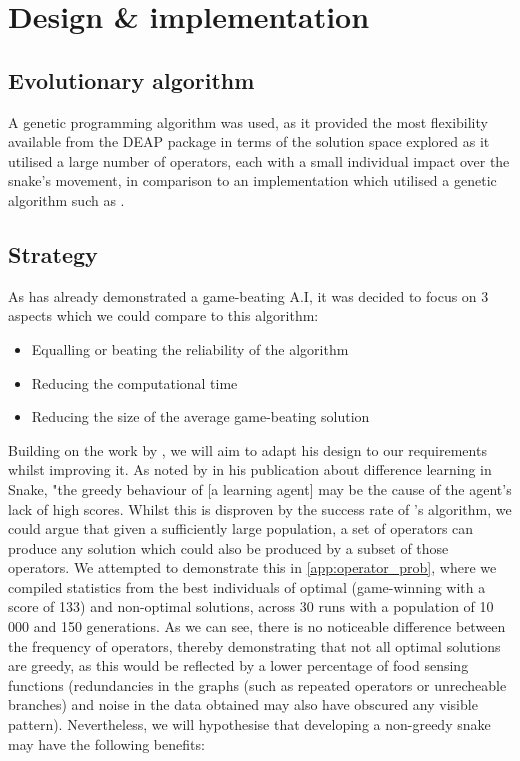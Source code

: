 \documentclass[british,10pt,a4paper]{article}
\begin{document}
\section{Design \& implementation}
\subsection{Evolutionary algorithm}
A genetic programming algorithm was used, as it provided the most flexibility available from the DEAP package in terms of the solution space explored as it utilised a large number of operators, each with a small individual impact over the snake's movement, in comparison to an implementation which utilised a genetic algorithm such as \citet{Yeh2016-ts}.

\subsection{Strategy}
As \citet{Ehlis2000-sz} has already demonstrated a game-beating A.I, it was decided to focus on 3 aspects which we could compare to this algorithm:
\begin{itemize}
	\item Equalling or beating the reliability of the algorithm
	\item Reducing the computational time
	\item Reducing the size of the average game-beating solution
\end{itemize}
Building on the work by \citeauthor{Ehlis2000-sz}, we will aim to adapt his design to our requirements whilst improving it. As noted by \citet{Christopher_Lockhart2010-em} in his publication about difference learning in Snake, "the greedy behaviour of [a learning agent] may be the cause of the agent's lack of high scores. Whilst this is disproven by the success rate of \citeauthor{Ehlis2000-sz}'s algorithm, we could argue that given a sufficiently large population, a set of operators can produce any solution which could also be produced by a subset of those operators. We attempted to demonstrate this in \autoref{app:operator_prob}, where we compiled statistics from the best individuals of optimal (game-winning with a score of 133) and non-optimal solutions, across 30 runs with a population of 10 000 and 150 generations. As we can see, there is no noticeable difference between the frequency of operators, thereby demonstrating that not all optimal solutions are greedy, as this would be reflected by a lower percentage of food sensing functions (redundancies in the graphs (such as repeated operators or unrecheable branches) and noise in the data obtained may also have obscured any visible pattern). Nevertheless, we will hypothesise that developing a non-greedy snake may have the following benefits:
\end{document}
